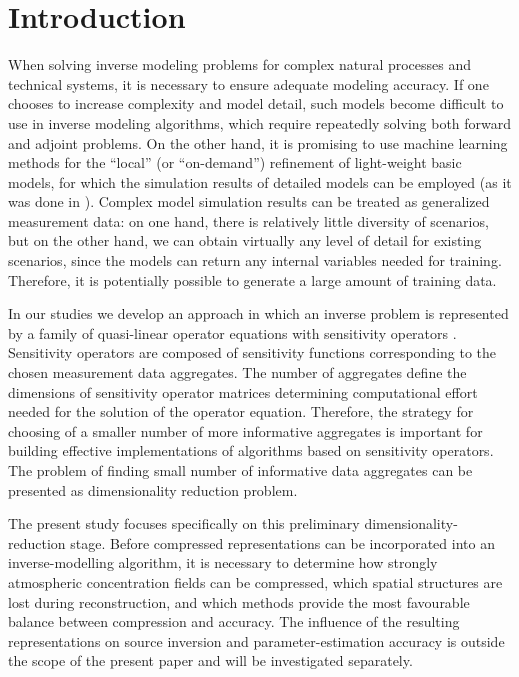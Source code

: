 \documentclass[pdflatex,sn-mathphys-num]{sn-jnl}%
\theoremstyle{thmstyleone}%
\theoremstyle{thmstyletwo}%
\theoremstyle{thmstylethree}%
\begin{document}
\section{Introduction}\label{sec1}

When solving inverse modeling problems for complex natural processes and technical systems, it is necessary to ensure adequate modeling accuracy. If one chooses to increase complexity and model detail, such models become difficult to use in inverse modeling algorithms, which require repeatedly solving both forward and adjoint problems. On the other hand, it is promising to use machine learning methods for the ``local'' (or ``on-demand'') refinement of light-weight basic models, for which the simulation results of detailed models can be employed (as it was done in \cite{Penenko2025MetHyd}). Complex model simulation results can be treated as generalized measurement data: on one hand, there is relatively little diversity of scenarios, but on the other hand, we can obtain virtually any level of detail for existing scenarios, since the models can return any internal variables needed for training. Therefore, it is potentially possible to generate a large amount of training data.

In our studies we develop an approach in which an inverse problem is represented by a family of quasi-linear operator equations with sensitivity operators \cite{re:PenenkoIPI2020,Penenko2025b}. Sensitivity operators are composed of sensitivity functions corresponding to the chosen measurement data aggregates. The number of aggregates define the dimensions of sensitivity operator matrices determining computational effort needed for the solution of the operator equation. Therefore, the strategy for choosing of a smaller number of more informative aggregates is important for building effective implementations of algorithms based on sensitivity operators. The problem of finding small number of informative data aggregates can be presented as dimensionality reduction problem.    

The present study focuses specifically on this preliminary dimensionality-reduction stage. Before compressed representations can be incorporated into an inverse-modelling algorithm, it is necessary to determine how strongly atmospheric concentration fields can be compressed, which spatial structures are lost during reconstruction, and which methods provide the most favourable balance between compression and accuracy. The influence of the resulting representations on source inversion and parameter-estimation accuracy is outside the scope of the present paper and will be investigated separately.
\end{document}

